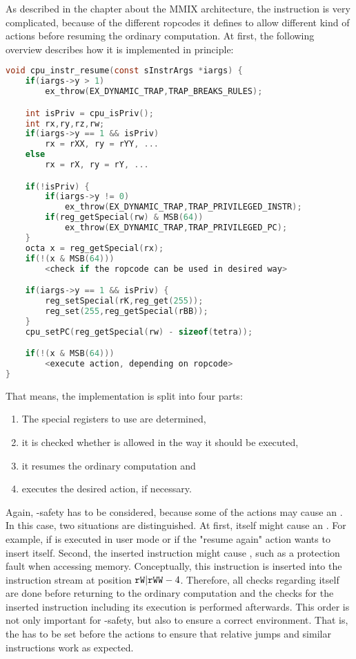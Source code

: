 As described in the chapter about the MMIX architecture, the  instruction is very complicated, because of the different ropcodes it defines to allow different kind of actions before resuming the ordinary computation. At first, the following overview describes how it is implemented in principle:
\begin{lstlisting}[language=C,caption={The implementation of \mi{RESUME} (partially pseudo-code)}]
void cpu_instr_resume(const sInstrArgs *iargs) {
	if(iargs->y > 1)
		ex_throw(EX_DYNAMIC_TRAP,TRAP_BREAKS_RULES);

	int isPriv = cpu_isPriv();
	int rx,ry,rz,rw;
	if(iargs->y == 1 && isPriv)
		rx = rXX, ry = rYY, ...
	else
		rx = rX, ry = rY, ...

	if(!isPriv) {
		if(iargs->y != 0)
			ex_throw(EX_DYNAMIC_TRAP,TRAP_PRIVILEGED_INSTR);
		if(reg_getSpecial(rw) & MSB(64))
			ex_throw(EX_DYNAMIC_TRAP,TRAP_PRIVILEGED_PC);
	}
	octa x = reg_getSpecial(rx);
	if(!(x & MSB(64)))
		<check if the ropcode can be used in desired way>

	if(iargs->y == 1 && isPriv) {
		reg_setSpecial(rK,reg_get(255));
		reg_set(255,reg_getSpecial(rBB));
	}
	cpu_setPC(reg_getSpecial(rw) - sizeof(tetra));

	if(!(x & MSB(64)))
		<execute action, depending on ropcode>
}
\end{lstlisting}
That means, the implementation is split into four parts:
\begin{enumerate}
	\item The special registers to use are determined,
	\item it is checked whether  is allowed in the way it should be executed,
	\item it resumes the ordinary computation and
	\item executes the desired action, if necessary.
\end{enumerate}
Again, -safety has to be considered, because some of the actions may cause an . In this case, two situations are distinguished. At first,  itself might cause an . For example, if  is executed in user mode or if the "resume again" action wants to insert  itself. Second, the inserted instruction might cause , such as a protection fault when accessing memory. Conceptually, this instruction is inserted into the instruction stream at position ${\tt rW}|{\tt rWW}-4$. Therefore, all checks regarding  itself are done before returning to the ordinary computation and the checks for the inserted instruction including its execution is performed afterwards. This order is not only important for -safety, but also to ensure a correct environment. That is, \eg the  has to be set before the actions to ensure that relative jumps and similar instructions work as expected.

